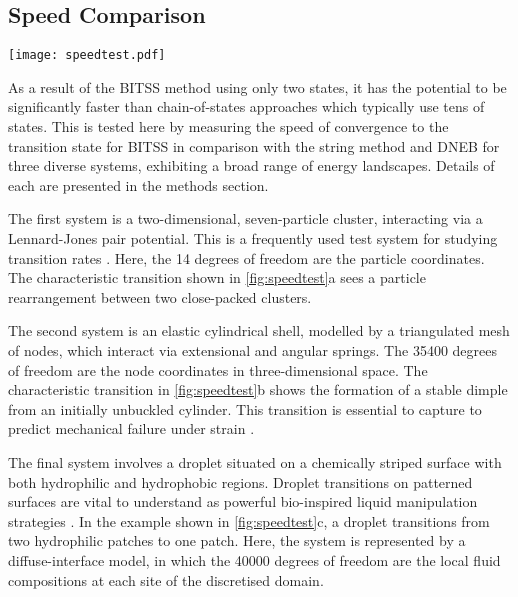 \documentclass[twocolumn,10pt]{revtex4}
\begin{document}
\subsection{Speed Comparison}
\begin{figure*}[tb]
  \texttt{[image: speedtest.pdf]}
  \caption{\label{fig:speedtest}
    Comparisons between BITSS, DNEB, and the string method in the convergence to the transition state as a function of the number of calculations of the energy gradient.
    Three test systems are used: (a) a Lennard-Jones seven-particle cluster, (b) cylindrical shell buckling, and (c) wetting of a chemically-striped surface.
    The configurations shown correspond to the two minimum energy states and the transition state, marked by an asterisk.
    The string method and DNEB are repeated with a differing number of images, as listed in the legend in (c).
  }
\end{figure*}

As a result of the BITSS method using only two states, it has the potential to be significantly faster than chain-of-states approaches which typically use tens of states.
This is tested here by measuring the speed of convergence to the transition state for BITSS in comparison with the string method and DNEB for three diverse systems, exhibiting a broad range of energy landscapes.
Details of each are presented in the methods section.

The first system is a two-dimensional, seven-particle cluster, interacting via a Lennard-Jones pair potential.
This is a frequently used test system for studying transition rates \cite{Wales2002,Passerone2001}.
Here, the \num{14} degrees of freedom are the particle coordinates.
The characteristic transition shown in \cref{fig:speedtest}a sees a particle rearrangement between two close-packed clusters.

The second system is an elastic cylindrical shell, modelled by a triangulated mesh of nodes, which interact via extensional and angular springs.
The \num{35400} degrees of freedom are the node coordinates in three-dimensional space.
The characteristic transition in \cref{fig:speedtest}b shows the formation of a stable dimple from an initially unbuckled cylinder.
This transition is essential to capture to predict mechanical failure under strain \cite{Panter2019,Virot2017}.

The final system involves a droplet situated on a chemically striped surface with both hydrophilic and hydrophobic regions.
Droplet transitions on patterned surfaces are vital to understand as powerful bio-inspired liquid manipulation strategies  \cite{Kusumaatmaja2006,Brown2016}.
In the example shown in \cref{fig:speedtest}c, a droplet transitions from two hydrophilic patches to one patch.
Here, the system is represented by a diffuse-interface model, in which the \num{40000} degrees of freedom are the local fluid compositions at each site of the discretised domain.
\end{document}
